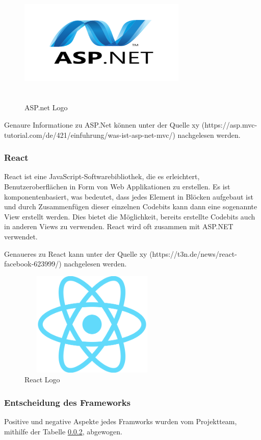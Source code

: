 \begin{figure}[h]
	\centering
	\includegraphics[height=6cm,width=8cm]{images/ASP.net_Logo}
	\caption{ASP.net Logo}
	\label{fig:ASP.net Logo}
\end{figure}


Genaure Informatione zu ASP.Net können unter der Quelle xy (https://asp.mvc-tutorial.com/de/421/einfuhrung/was-ist-asp-net-mvc/) nachgelesen werden.
\newpage
\subsubsection{React}
React ist eine JavaScript-Softwarebibliothek, die es erleichtert, Benutzeroberflächen in Form von Web Applikationen zu erstellen. Es ist komponentenbasiert, was bedeutet, dass jedes Element in Blöcken aufgebaut ist und durch Zusammenfügen dieser einzelnen Codebits kann dann eine sogenannte View erstellt werden. Dies bietet die Möglichkeit, bereits erstellte Codebits auch in anderen Views zu verwenden. React wird oft zusammen mit ASP.NET verwendet.


Genaueres zu React kann unter der Quelle xy (https://t3n.de/news/react-facebook-623999/) nachgelesen werden.
\begin{figure}[h]
	\centering
	\includegraphics[height=5cm,width=7cm]{images/React_Logo}
	\caption{React Logo}
	\label{fig:React Logo}
\end{figure}
\newpage

\subsubsection{Entscheidung des Frameworks}\label{sec:Entscheidung des Frameworks}
Positive und negative Aspekte jedes Framworks wurden vom Projektteam, mithilfe der Tabelle \ref{sec:Entscheidung des Frameworks}, abgewogen.

